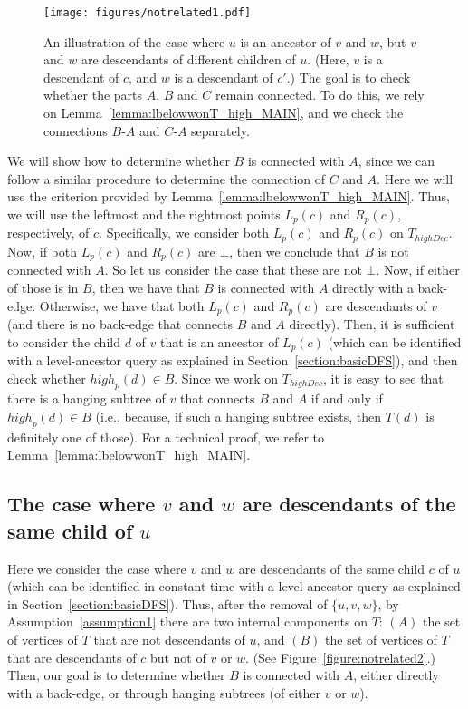 \documentclass[11pt,a4paper]{article}
\begin{document}
\begin{figure}[h!]\centering
\texttt{[image: figures/notrelated1.pdf]}
\caption{\small{An illustration of the case where $u$ is an ancestor of $v$ and $w$, but $v$ and $w$ are descendants of different children of $u$. (Here, $v$ is a descendant of $c$, and $w$ is a descendant of $c'$.) The goal is to check whether the parts $A$, $B$ and $C$ remain connected. To do this, we rely on Lemma~\ref{lemma:lbelowwonT_high_MAIN}, and we check the connections $B$-$A$ and $C$-$A$ separately.}}\label{figure:notrelated1}
\end{figure}

We will show how to determine whether $B$ is connected with $A$, since we can follow a similar procedure to determine the connection of $C$ and $A$. Here we will use the criterion provided by Lemma~\ref{lemma:lbelowwonT_high_MAIN}. Thus, we will use the leftmost and the rightmost points $L_p(c)$ and $R_p(c)$, respectively, of $c$. Specifically, we consider both $L_p(c)$ and $R_p(c)$ on $T_\mathit{highDec}$. Now, if both $L_p(c)$ and $R_p(c)$ are $\bot$, then we conclude that $B$ is not connected with $A$. So let us consider the case that these are not $\bot$. Now, if either of those is in $B$, then we have that $B$ is connected with $A$ directly with a back-edge. Otherwise, we have that both $L_p(c)$ and $R_p(c)$ are descendants of $v$ (and there is no back-edge that connects $B$ and $A$ directly). Then, it is sufficient to consider the child $d$ of $v$ that is an ancestor of $L_p(c)$ (which can be identified with a level-ancestor query as explained in Section~\ref{section:basicDFS}), and then check whether $\mathit{high}_p(d)\in B$. Since we work on $T_\mathit{highDec}$, it is easy to see that there is a hanging subtree of $v$ that connects $B$ and $A$ if and only if $\mathit{high}_p(d)\in B$ (i.e., because, if such a hanging subtree exists, then $T(d)$ is definitely one of those). For a technical proof, we refer to Lemma~\ref{lemma:lbelowwonT_high_MAIN}.


\subsection{The case where $v$ and $w$ are descendants of the same child of $u$}
\label{section:vwdescendantsofc}
Here we consider the case where $v$ and $w$ are descendants of the same child $c$ of $u$ (which can be identified in constant time with a level-ancestor query as explained in Section~\ref{section:basicDFS}). Thus, after the removal of $\{u,v,w\}$, by Assumption~\ref{assumption1} there are two internal components on $T$: $(A)$ the set of vertices of $T$ that are not descendants of $u$, and $(B)$ the set of vertices of $T$ that are descendants of $c$ but not of $v$ or $w$. (See Figure~\ref{figure:notrelated2}.) Then, our goal is to determine whether $B$ is connected with $A$, either directly with a back-edge, or through hanging subtrees (of either $v$ or $w$).
\end{document}
